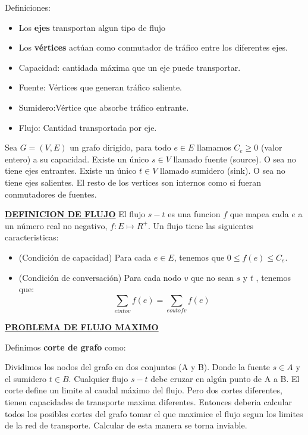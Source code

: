 \documentclass{article}
\begin{document}
Definiciones:
\begin{itemize}
    \item Los \textbf{ejes} transportan algun tipo de flujo
    \item Los \textbf{vértices} actúan como conmutador de tráfico entre los diferentes ejes.
    \item Capacidad: cantidada máxima que un eje puede transportar.
    \item Fuente: Vértices que generan tráfico saliente.
    \item Sumidero:Vértice que absorbe tráfico entrante.
    \item Flujo: Cantidad transportada por eje.
\end{itemize}

Sea \(G=(V,E)\) un grafo dirigido, para todo \(e \in E\) llamamos \(C_e \geq 0\) (valor entero) a su capacidad.
Existe un único \(s \in V\) llamado fuente (source). O sea no tiene ejes entrantes.
Existe un único \(t \in V\) llamado sumidero (sink). O sea no tiene ejes salientes.
El resto de los vertices son internos como si fueran conmutadores de fuentes.

\noindent
\textbf{\underline{DEFINICION DE FLUJO}}
El flujo \(s-t\) es una funcion \(f\) que mapea cada \(e\) a un número real no negativo,
\(f: E \mapsto R^+\). Un flujo tiene las siguientes caracteristicas:

\begin{itemize}
    \item (Condición de capacidad) Para cada \(e \in E\), tenemos que \(0 \leq f(e) \leq C_e\).
    \item (Condición de conversación) Para cada nodo \(v\) que no sean \(s\) y \(t\) , tenemos que:
    \[
        \sum_{e into v} f(e)  = \sum_{e out of v} f(e) 
    \]
\end{itemize}

\noindent
\textbf{\underline{PROBLEMA DE FLUJO MAXIMO}}

Definimos \textbf{corte de grafo} como: 

Dividimos los nodos del grafo en dos conjuntos (A y B). Donde la fuente \(s \in A\) y 
el sumidero \(t \in B\). Cualquier flujo \(s-t\) debe cruzar en algún punto de A a B.
El corte define un limite al caudal máximo del flujo. Pero dos cortes diferentes, 
tienen capacidades de transporte maxima diferentes. Entonces deberia calcular todos
los posibles cortes del grafo tomar el que maximice el flujo segun los limites de la 
red de transporte. Calcular de esta manera se torna inviable.
\end{document}
